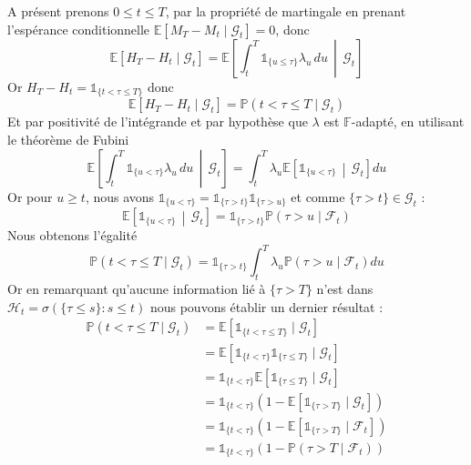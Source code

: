 A présent prenons $0 \le t \le T$, par la propriété de martingale en prenant l'espérance
conditionnelle $ \mathbb{E}[M_T - M_t \mid \mathcal{G}_t] = 0 $, donc
\begin{equation}
    \mathbb{E}[H_T - H_t \mid \mathcal{G}_t] = \mathbb{E}\left[ \int_t^T \mathbb{1}_{ \{ u \le \tau \} } \lambda_u \, du \, \middle| \, \mathcal{G}_t \right]
\end{equation}
Or $ H_T - H_t = \mathbb{1}_{ \{ t < \tau \le T \} } $ donc
\begin{equation}
    \mathbb{E}[H_T - H_t \mid \mathcal{G}_t] = \mathbb{P}( t < \tau \le T \mid \mathcal{G}_t)
\end{equation}
Et par positivité de l'intégrande et par hypothèse que $\lambda$ est $\mathbb{F}$-adapté, en utilisant le théorème de Fubini
\begin{equation}
    \mathbb{E}\left[ \int_t^T \mathbb{1}_{ \{ u < \tau \} } \lambda_u \, du \, \middle| \, \mathcal{G}_t \right]
    = \int_t^T \lambda_u \mathbb{E}\left[ \mathbb{1}_{ \{ u < \tau \} } \, \middle| \, \mathcal{G}_t  \right]  du 
\end{equation}
Or pour $u \ge t $, nous avons $ \mathbb{1}_{ \{ u < \tau \} } = \mathbb{1}_{ \{ \tau > t \} }\mathbb{1}_{ \{ \tau > u \} }$ et comme
$ \{ \tau > t \} \in \mathcal{G}_t$ :
\begin{equation}
    \mathbb{E}\left[ \mathbb{1}_{ \{ u < \tau \} } \, \middle| \, \mathcal{G}_t  \right] = \mathbb{1}_{ \{ \tau > t \} } \mathbb{P}( \tau > u \mid \mathcal{F}_t)
\end{equation}  
Nous obtenons l'égalité
\begin{equation}
    \mathbb{P}( t < \tau \le T \mid \mathcal{G}_t)
    = \mathbb{1}_{ \{ \tau > t \} } \int_t^T \lambda_u \mathbb{P}( \tau > u \mid \mathcal{F}_t)  du 
\end{equation}
Or en remarquant qu'aucune information lié à $\{ \tau > T \}$ n'est dans $\mathcal{H}_t = \sigma(\{\tau \leq s\} : s \leq t)$ nous pouvons établir un dernier résultat : 
\begin{align*}
    \mathbb{P}( t < \tau \le T \mid \mathcal{G}_t) & = \mathbb{E}[ \mathbb{1}_{\{t < \tau \le T\}} \mid \mathcal{G}_t ] \\
    & = \mathbb{E}[ \mathbb{1}_{\{t < \tau \}} \mathbb{1}_{\{ \tau \le T\}} \mid \mathcal{G}_t ] \\
    & = \mathbb{1}_{\{t < \tau \}} \mathbb{E}[\mathbb{1}_{\{ \tau \le T\}} \mid \mathcal{G}_t ] \\
    & = \mathbb{1}_{\{t < \tau \}} (1 - \mathbb{E}[\mathbb{1}_{\{ \tau > T\}} \mid \mathcal{G}_t ]) \\
    & = \mathbb{1}_{\{t < \tau \}} (1 - \mathbb{E}[\mathbb{1}_{\{ \tau > T\}} \mid \mathcal{F}_t ]) \\
    & = \mathbb{1}_{\{t < \tau \}} (1 - \mathbb{P}( \tau > T \mid \mathcal{F}_t ))
\end{align*}

